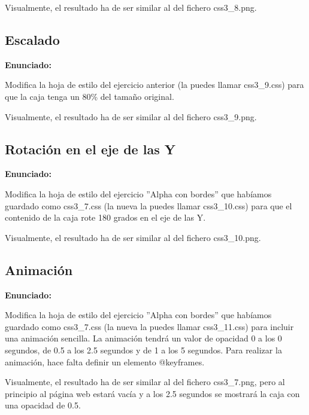 Visualmente, el resultado ha de ser similar al del fichero css3\_8.png.

\subsection{Escalado}
\label{subsec:escalado}

\textbf{Enunciado:}

Modifica la hoja de estilo del ejercicio anterior (la puedes llamar css3\_9.css) para que la caja tenga un 80\% del tamaño original.

Visualmente, el resultado ha de ser similar al del fichero css3\_9.png.

\subsection{Rotación en el eje de las Y}
\label{subsec:rotacionY}

\textbf{Enunciado:}

Modifica la hoja de estilo del ejercicio ''Alpha con bordes'' que habíamos guardado como css3\_7.css (la nueva la puedes llamar css3\_10.css) para que el contenido de la caja rote 180 grados en el eje de las Y.

Visualmente, el resultado ha de ser similar al del fichero css3\_10.png.



\subsection{Animación}
\label{subsec:animacion}

\textbf{Enunciado:}

Modifica la hoja de estilo del ejercicio ''Alpha con bordes'' que habíamos guardado como css3\_7.css (la nueva la puedes llamar css3\_11.css) para incluir una animación sencilla. La animación tendrá un valor de opacidad 0 a los 0 segundos, de 0.5 a los 2.5 segundos y de 1 a los 5 segundos. Para realizar la animación, hace falta definir un elemento @keyframes.

Visualmente, el resultado ha de ser similar al del fichero css3\_7.png, pero al principio al página web estará vacía y a los 2.5 segundos se mostrará la caja con una opacidad de 0.5.


